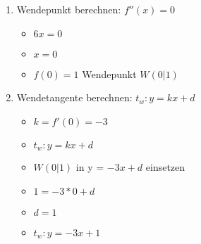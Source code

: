 \begin{enumerate}
\begin{itemize}
    \end{itemize}
    \item Wendepunkt berechnen: $f''(x)=0$ \begin{itemize}
        \item $6x=0$
        \item $x=0$
        \item $f(0)=1$ Wendepunkt $W(0|1)$
    \end{itemize}
    \item Wendetangente berechnen: $t_w:y=kx+d$ \begin{itemize}
        \item $k=f'(0)=-3$
        \item $t_w:y=kx+d$
        \item $W(0|1)$ in y = $-3x+d$ einsetzen 
        \item $1=-3*0+d$
        \item $d=1$
        \item $t_w:y=-3x+1$
    \end{itemize}
\end{enumerate}


